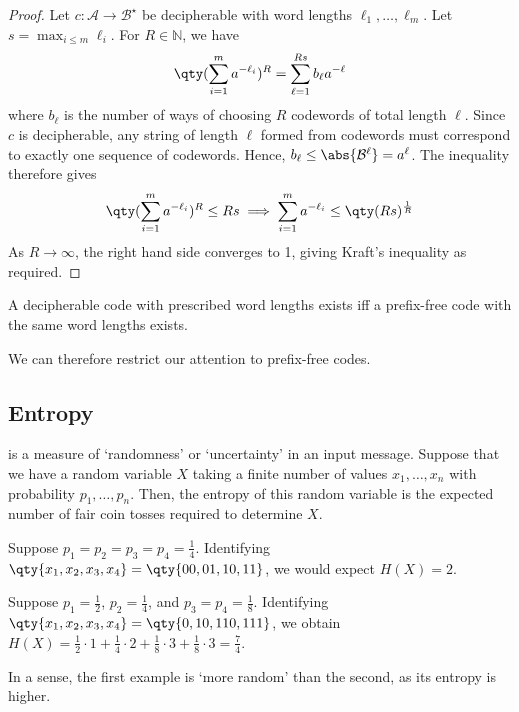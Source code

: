 \begin{proof}
    Let $c \colon \mathcal A \to \mathcal B^\star$ be decipherable with word lengths $\ell_1, \dots, \ell_m$.
    Let $s = \max_{i \leq m} \ell_i$.
    For $R \in \mathbb N$, we have
    \[ \qty(\sum_{i=1}^m a^{-\ell_i})^R = \sum_{\ell = 1}^{Rs} b_\ell a^{-\ell} \]
    where $b_\ell$ is the number of ways of choosing $R$ codewords of total length $\ell$.
    Since $c$ is decipherable, any string of length $\ell$ formed from codewords must correspond to exactly one sequence of codewords.
    Hence, $b_\ell \leq \abs{\mathcal B^\ell} = a^\ell$.
    The inequality therefore gives
    \[ \qty(\sum_{i=1}^m a^{-\ell_i})^R \leq Rs \implies \sum_{i=1}^m a^{-\ell_i} \leq \qty(Rs)^{\frac{1}{R}} \]
    As $R \to \infty$, the right hand side converges to 1, giving Kraft's inequality as required.
\end{proof}

\begin{corollary}
    A decipherable code with prescribed word lengths exists iff a prefix-free code with the same word lengths exists.
\end{corollary}
We can therefore restrict our attention to prefix-free codes.

\subsection{Entropy}
 is a measure of `randomness' or `uncertainty' in an input message.
Suppose that we have a random variable $X$ taking a finite number of values $x_1, \dots, x_n$ with probability $p_1, \dots, p_n$.
Then, the entropy of this random variable is the expected number of fair coin tosses required to determine $X$.

\begin{example}
    Suppose $p_1 = p_2 = p_3 = p_4 = \frac{1}{4}$.
    Identifying $\qty{x_1, x_2, x_3, x_4} = \qty{00, 01, 10, 11}$, we would expect $H(X) = 2$.
\end{example}

\begin{example}
    Suppose $p_1 = \frac{1}{2}$, $p_2 = \frac{1}{4}$, and $p_3 = p_4 = \frac{1}{8}$.
    Identifying $\qty{x_1, x_2, x_3, x_4} = \qty{0, 10, 110, 111}$, we obtain $H(X) = \frac{1}{2} \cdot 1 + \frac{1}{4} \cdot 2 + \frac{1}{8} \cdot 3 + \frac{1}{8} \cdot 3 = \frac{7}{4}$.
\end{example}

In a sense, the first example is `more random' than the second, as its entropy is higher.

